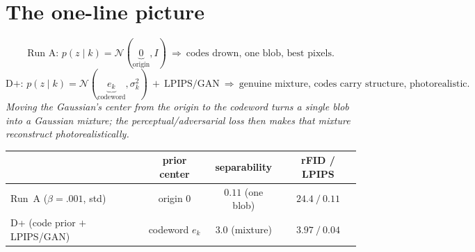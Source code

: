 \documentclass[11pt]{article}
\newcommand{\hl}[1]{\textcolor{good}{#1}}
\begin{document}
\section*{The one-line picture}
\[
\text{Run A: } p(z\mid k)=\mathcal N(\underbrace{0}_{\text{origin}},I)\ \Rightarrow\ \text{codes drown, one blob, best pixels.}
\]
\[
\text{D+: } p(z\mid k)=\mathcal N(\underbrace{e_k}_{\text{codeword}},\sigma_k^2)\ +\ \text{LPIPS/GAN}\ \Rightarrow\ \text{genuine mixture, codes carry structure, photorealistic.}
\]
\emph{Moving the Gaussian's center from the origin to the codeword turns a single blob into a Gaussian
mixture; the perceptual/adversarial loss then makes that mixture reconstruct photorealistically.}

\begin{center}\small
\begin{tabular}{lccc}
\toprule
 & prior center & separability & rFID / LPIPS\\
\midrule
Run~A ($\beta{=}.001$, std) & origin $0$ & $0.11$ (one blob) & $24.4\ /\ 0.11$\\
D+ (code prior $+$ LPIPS/GAN) & codeword $e_k$ & \hl{$3.0$ (mixture)} & \hl{$3.97\ /\ 0.04$}\\
\bottomrule
\end{tabular}
\end{center}
\end{document}
